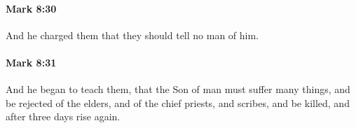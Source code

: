 		\paragraph{Mark 8:30} %
			\label{MARK-8-30}

			And he charged them that they should tell no man of him.

			\begin{framed}
			\scriptsize
				\begin{compactdesc}
					\item[SBLG] 
				\end{compactdesc}
			\end{framed}

		\paragraph{Mark 8:31} %
			\label{MARK-8-31}

			And he began to teach them, that the Son of man must suffer many things, and be rejected of the elders, and of the chief priests, and scribes, and be killed, and after three days rise again.

